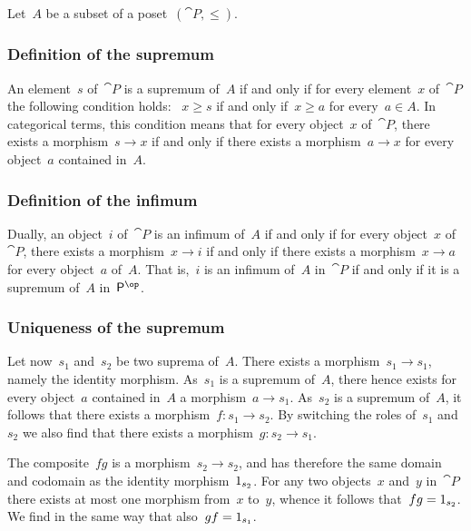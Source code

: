 \subsection{}

Let~$A$ be a subset of a poset~$(\cat{P}, ≤)$.



\subsubsection*{Definition of the supremum}

An element~$s$ of~$\cat{P}$ is a supremum of~$A$ if and only if for every element~$x$ of~$\cat{P}$ the following condition holds:~%
$x ≥ s$ if and only if~$x ≥ a$ for every~$a ∈ A$.
In categorical terms, this condition means that for every object~$x$ of~$\cat{P}$, there exists a morphism~$s \to x$ if and only if there exists a morphism~$a \to x$ for every object~$a$ contained in~$A$.



\subsubsection*{Definition of the infimum}

Dually, an object~$i$ of~$\cat{P}$ is an infimum of~$A$ if and only if for every object~$x$ of~$\cat{P}$, there exists a morphism~$x \to i$ if and only if there exists a morphism~$x \to a$ for every object~$a$ of~$A$.
That is,~$i$ is an infimum of~$A$ in~$\cat{P}$ if and only if it is a supremum of~$A$ in~$\cat{P}^{\op}$.



\subsubsection*{Uniqueness of the supremum}

Let now~$s_1$ and~$s_2$ be two suprema of~$A$.
There exists a morphism~$s_1 \to s_1$, namely the identity morphism.
As~$s_1$ is a supremum of~$A$, there hence exists for every object~$a$ contained in~$A$ a morphism~$a \to s_1$.
As~$s_2$ is a supremum of~$A$, it follows that there exists a morphism~$f \colon s_1 \to s_2$.
By switching the roles of~$s_1$ and~$s_2$ we also find that there exists a morphism~$g \colon s_2 \to s_1$.

The composite~$f g$ is a morphism~$s_2 \to s_2$, and has therefore the same domain and codomain as the identity morphism~$1_{s_2}$.
For any two objects~$x$ and~$y$ in~$\cat{P}$ there exists at most one morphism from~$x$ to~$y$, whence it follows that~$f g = 1_{s_2}$.
We find in the same way that also~$g f = 1_{s_1}$.

